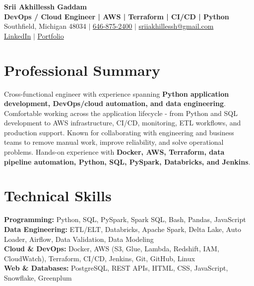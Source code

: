 \documentclass[letterpaper,10pt]{article}
\begin{document}
\fontsize{9.35pt}{10.45pt}\selectfont

\begin{center}
    {\LARGE \textbf{Srii Akhillessh Gaddam}} \\[-1pt]
    \textbf{DevOps / Cloud Engineer | AWS | Terraform | CI/CD | Python} \\[2pt]
    Southfield, Michigan 48034 $|$
    \href{tel:6468752400}{646-875-2400} $|$
    \href{mailto:sriiakhillessh@gmail.com}{sriiakhillessh@gmail.com} \\[1pt]
    \href{https://www.linkedin.com/in/srii-akhiilessh-gaddam-b48668191/}{LinkedIn} $|$
    \href{https://sriiakhillesshg.github.io/portfolio/}{Portfolio}
\end{center}
\vspace{-8pt}

\section{Professional Summary}
\small{Cross-functional engineer with experience spanning \textbf{Python application development, DevOps/cloud automation, and data engineering}. Comfortable working across the application lifecycle - from Python and SQL development to AWS infrastructure, CI/CD, monitoring, ETL workflows, and production support. Known for collaborating with engineering and business teams to remove manual work, improve reliability, and solve operational problems. Hands-on experience with \textbf{Docker, AWS, Terraform, data pipeline automation, Python, SQL, PySpark, Databricks, and Jenkins}.}

\section{Technical Skills}
\small{
\textbf{Programming:} Python, SQL, PySpark, Spark SQL, Bash, Pandas, JavaScript \\
\textbf{Data Engineering:} ETL/ELT, Databricks, Apache Spark, Delta Lake, Auto Loader, Airflow, Data Validation, Data Modeling \\
\textbf{Cloud \& DevOps:} Docker, AWS (S3, Glue, Lambda, Redshift, IAM, CloudWatch), Terraform, CI/CD, Jenkins, Git, GitHub, Linux \\
\textbf{Web \& Databases:} PostgreSQL, REST APIs, HTML, CSS, JavaScript, Snowflake, Greenplum
}
\end{document}
